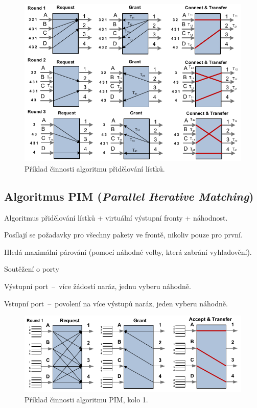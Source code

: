 \begin{figure}[H]
    \centering
    \includegraphics[width=1\linewidth]{algoritmus_pridelovani_listku_priklad.pdf}
    \caption{Příklad činnosti algoritmu přidělování lístků.}
\end{figure}

\subsection{Algoritmus PIM (\textit{Parallel Iterative Matching})}

\begin{compactitem}
    \item Algoritmus přidělování lístků + virtuální výstupní fronty + náhodnost. \begin{compactitem}
        \item Posílají se požadavky pro všechny pakety ve frontě, nikoliv pouze pro první.
    \end{compactitem}
    \item Hledá maximální párování (pomocí náhodné volby, která zabrání vyhladovění).
    \item Soutěžení o porty \begin{compactitem}
        \item Výstupní port~--~více žádostí naráz, jednu vyberu náhodně.
        \item Vstupní port~--~povolení na více výstupů naráz, jeden vyberu náhodně.
    \end{compactitem}
\end{compactitem}

\begin{figure}[H]
    \centering
    \includegraphics[width=1\linewidth]{algoritmus_pim_priklad_1.pdf}
    \caption{Příklad činnosti algoritmu PIM, kolo 1.}
\end{figure}

